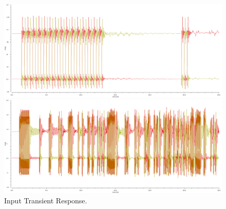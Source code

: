 \documentclass{book}  %
\begin{document}
\begin{paper}
\begin{figure}[htbp!]
	\centering	
	\begin{minipage}[tb]{0.5\textwidth}
		\centering	
		\includegraphics[height=0.15\textheight]{./img/channel_response_eye_diagram/input_transient_response_3gbp.png}
	\end{minipage}%
	\begin{minipage}[tb]{0.5\textwidth}
		\centering	
		\includegraphics[height=0.15\textheight]{./img/channel_response_eye_diagram/input_transient_response_20gbp.png}
	\end{minipage}
	\caption{Input Transient Response.}
\end{figure}


\end{paper}
\end{document}
